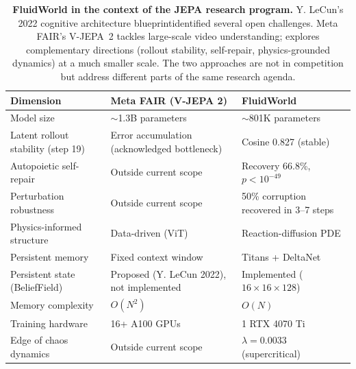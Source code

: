\begin{table}[t]
    \centering
    \caption{\textbf{FluidWorld in the context of the JEPA research program.} Y. LeCun's 2022 cognitive architecture blueprint\protect\footnotemark[2] identified several open challenges. Meta FAIR's V-JEPA~2 tackles large-scale video understanding; \fluidworld{} explores complementary directions (rollout stability, self-repair, physics-grounded dynamics) at a much smaller scale. The two approaches are not in competition but address different parts of the same research agenda.}
    \label{tab:fluidworld_vs_jepa}
    \begin{tabular}{lp{4.8cm}p{4.8cm}}
        \toprule
        \textbf{Dimension} & \textbf{Meta FAIR (V-JEPA 2)\protect\footnotemark[1]} & \textbf{FluidWorld} \\
        \midrule
        Model size
            & $\sim$1.3B parameters
            & $\sim$801K parameters \\
        \addlinespace
        Latent rollout stability (step 19)
            & Error accumulation (acknowledged bottleneck)
            & Cosine 0.827 (stable) \\
        \addlinespace
        Autopoietic self-repair
            & Outside current scope
            & Recovery 66.8\%, $p < 10^{-49}$ \\
        \addlinespace
        Perturbation robustness
            & Outside current scope
            & 50\% corruption recovered in 3--7 steps \\
        \addlinespace
        Physics-informed structure
            & Data-driven (ViT)
            & Reaction-diffusion PDE \\
        \addlinespace
        Persistent memory
            & Fixed context window
            & Titans + DeltaNet \\
        \addlinespace
        Persistent state (BeliefField)
            & Proposed (Y. LeCun 2022\protect\footnotemark[2]), not implemented
            & Implemented ($16 \times 16 \times 128$) \\
        \addlinespace
        Memory complexity
            & $O(N^2)$
            & $O(N)$ \\
        \addlinespace
        Training hardware
            & 16+ A100 GPUs
            & 1 RTX 4070 Ti \\
        \addlinespace
        Edge of chaos dynamics
            & Outside current scope
            & $\lambda = 0.0033$ (supercritical) \\
        \bottomrule
    \end{tabular}

    \vspace{0.5em}
\end{table}
